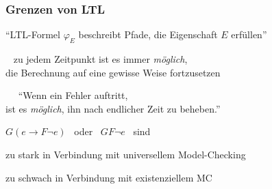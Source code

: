 \begin{frame}
  \frametitle{Grenzen von LTL}

  "`LTL-Formel $\varphi_E$ beschreibt Pfade, die Eigenschaft $E$ erfüllen"'

  \par\bigskip
  ~ zu jedem Zeitpunkt ist es immer \emph{möglich},\\
  die Berechnung auf eine gewisse Weise fortzusetzen

  \par\bigskip
    ~~
    "`Wenn ein Fehler auftritt,\\
    ist es \emph{möglich}, ihn nach endlicher Zeit zu beheben."'
    \par\smallskip
    $G(e \to F \neg e)$ ~oder~ $GF\neg e$ ~sind
    \begin{Itemize}
      \item
        zu stark in Verbindung mit universellem Model-Checking \Tafel
      \item
        zu schwach in Verbindung mit existenziellem MC \TafelForts
    \end{Itemize}

\end{frame}

